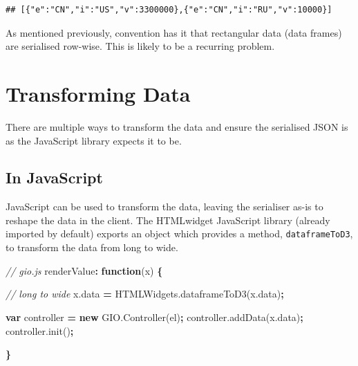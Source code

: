 \documentclass[
]{krantz}
\makeatletter
\newenvironment{Shaded}{\begin{snugshade}}{\end{snugshade}}
\newcommand{\AttributeTok}[1]{\textcolor[rgb]{0.61,0.61,0.61}{#1}}
\newcommand{\CommentTok}[1]{\textcolor[rgb]{0.37,0.37,0.37}{\textit{#1}}}
\newcommand{\KeywordTok}[1]{\textcolor[rgb]{0.27,0.27,0.27}{\textbf{#1}}}
\newcommand{\NormalTok}[1]{#1}
\newcommand{\OperatorTok}[1]{\textcolor[rgb]{0.43,0.43,0.43}{\textbf{#1}}}
\newcommand{\VariableTok}[1]{\textcolor[rgb]{0,0,0}{#1}}
\newenvironment{kframe}{%
\medskip{}
\setlength{\fboxsep}{.8em}
 \def\at@end@of@kframe{}%
 \ifinner\ifhmode%
  \def\at@end@of@kframe{\end{minipage}}%
  \begin{minipage}{\columnwidth}%
 \fi\fi%
 \def\FrameCommand##1{\hskip\@totalleftmargin \hskip-\fboxsep
 \colorbox{shadecolor}{##1}\hskip-\fboxsep
     \hskip-\linewidth \hskip-\@totalleftmargin \hskip\columnwidth}%
 \MakeFramed {\advance\hsize-\width
   \@totalleftmargin\z@ \linewidth\hsize
   \@setminipage}}%
 {\par\unskip\endMakeFramed%
 \at@end@of@kframe}
\renewenvironment{Shaded}{\begin{kframe}}{\end{kframe}}
\makeatother
\begin{document}
\begin{verbatim}
## [{"e":"CN","i":"US","v":3300000},{"e":"CN","i":"RU","v":10000}]
\end{verbatim}

As mentioned previously, convention has it that rectangular data (data frames) are serialised row-wise. This is likely to be a recurring problem.

\hypertarget{transforming-data}{%
\section{Transforming Data}\label{transforming-data}}

There are multiple ways to transform the data and ensure the serialised JSON is as the JavaScript library expects it to be.

\hypertarget{in-javascript}{%
\subsection{In JavaScript}\label{in-javascript}}

JavaScript can be used to transform the data, leaving the serialiser as-is to reshape the data in the client. The HTMLwidget JavaScript library (already imported by default) exports an object which provides a method, \texttt{dataframeToD3}, to transform the data from long to wide.

\begin{Shaded}
\begin{Highlighting}[]
\CommentTok{// gio.js}
\NormalTok{renderValue}\OperatorTok{:} \KeywordTok{function}\NormalTok{(x) }\OperatorTok{\{}

  \CommentTok{// long to wide}
  \VariableTok{x}\NormalTok{.}\AttributeTok{data} \OperatorTok{=} \VariableTok{HTMLWidgets}\NormalTok{.}\AttributeTok{dataframeToD3}\NormalTok{(}\VariableTok{x}\NormalTok{.}\AttributeTok{data}\NormalTok{)}\OperatorTok{;}

  \KeywordTok{var}\NormalTok{ controller }\OperatorTok{=} \KeywordTok{new} \VariableTok{GIO}\NormalTok{.}\AttributeTok{Controller}\NormalTok{(el)}\OperatorTok{;}
  \VariableTok{controller}\NormalTok{.}\AttributeTok{addData}\NormalTok{(}\VariableTok{x}\NormalTok{.}\AttributeTok{data}\NormalTok{)}\OperatorTok{;} 
  \VariableTok{controller}\NormalTok{.}\AttributeTok{init}\NormalTok{()}\OperatorTok{;}

\OperatorTok{\}}
\end{Highlighting}
\end{Shaded}
\end{document}
